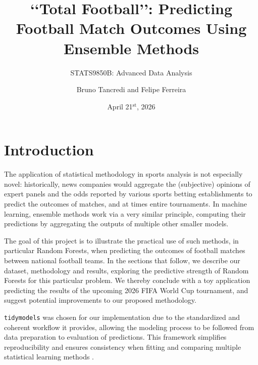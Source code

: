 \documentclass[12pt,paper=letter,leqno]{scrartcl}
\begin{document}
\title{\lq\lq Total Football\rq\rq: Predicting Football Match Outcomes Using Ensemble Methods}
\subtitle{STATS9850B: Advanced Data Analysis}
\author{Bruno Tancredi and Felipe Ferreira}
\date{April 21$^\text{st}$, 2026}
\maketitle
\thispagestyle{fancy}
\section{Introduction}
The application of statistical methodology in sports analysis is not especially novel: historically, news companies would aggregate the (subjective) opinions of expert panels and the odds reported by various sports betting establishments to predict the outcomes of matches, and at times entire tournaments. In machine learning, ensemble methods work via a very similar principle, computing their predictions by aggregating the outputs of multiple other smaller models.

The goal of this project is to illustrate the practical use of such methods, in particular Random Forests, when predicting the outcomes of football matches between national football teams. In the sections that follow, we describe our dataset, methodology and results, exploring the predictive strength of Random Forests for this particular problem. We thereby conclude with a toy application predicting the results of the upcoming 2026 FIFA World Cup tournament, and suggest potential improvements to our proposed methodology.

\texttt{tidymodels} was chosen for our implementation due to the standardized and coherent workflow it provides, allowing the modeling process to be followed from data preparation to evaluation of predictions. This framework simplifies reproducibility and ensures consistency when fitting and comparing multiple statistical learning methods \parencite{tidymodels}.
\end{document}
